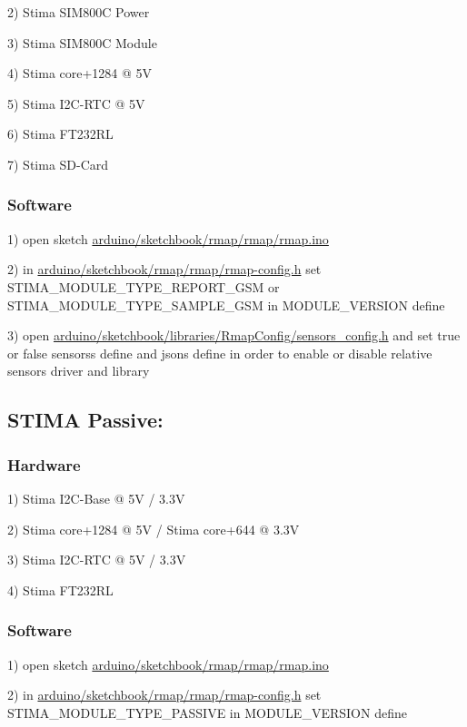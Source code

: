 2) Stima S\+I\+M800C Power

3) Stima S\+I\+M800C Module

4) Stima core+1284 @ 5V

5) Stima I2\+C-\/\+R\+TC @ 5V

6) Stima F\+T232\+RL

7) Stima S\+D-\/\+Card\hypertarget{index_stima_gsm_software}{}\subsubsection{Software}\label{index_stima_gsm_software}
1) open sketch \hyperlink{rmap_8ino}{arduino/sketchbook/rmap/rmap/rmap.\+ino}

2) in \hyperlink{rmap-config_8h}{arduino/sketchbook/rmap/rmap/rmap-\/config.\+h} set S\+T\+I\+M\+A\+\_\+\+M\+O\+D\+U\+L\+E\+\_\+\+T\+Y\+P\+E\+\_\+\+R\+E\+P\+O\+R\+T\+\_\+\+G\+SM or S\+T\+I\+M\+A\+\_\+\+M\+O\+D\+U\+L\+E\+\_\+\+T\+Y\+P\+E\+\_\+\+S\+A\+M\+P\+L\+E\+\_\+\+G\+SM in M\+O\+D\+U\+L\+E\+\_\+\+V\+E\+R\+S\+I\+ON define

3) open \hyperlink{sensors__config_8h}{arduino/sketchbook/libraries/\+Rmap\+Config/sensors\+\_\+config.\+h} and set true or false sensors\textquotesingle{}s define and json\textquotesingle{}s define in order to enable or disable relative sensor\textquotesingle{}s driver and library\hypertarget{index_stima_passive}{}\subsection{S\+T\+I\+M\+A Passive\+:}\label{index_stima_passive}
\hypertarget{index_stima_passive_hardware}{}\subsubsection{Hardware}\label{index_stima_passive_hardware}
1) Stima I2\+C-\/\+Base @ 5V / 3.\+3V

2) Stima core+1284 @ 5V / Stima core+644 @ 3.\+3V

3) Stima I2\+C-\/\+R\+TC @ 5V / 3.\+3V

4) Stima F\+T232\+RL\hypertarget{index_stima_passive_software}{}\subsubsection{Software}\label{index_stima_passive_software}
1) open sketch \hyperlink{rmap_8ino}{arduino/sketchbook/rmap/rmap/rmap.\+ino}

2) in \hyperlink{rmap-config_8h}{arduino/sketchbook/rmap/rmap/rmap-\/config.\+h} set S\+T\+I\+M\+A\+\_\+\+M\+O\+D\+U\+L\+E\+\_\+\+T\+Y\+P\+E\+\_\+\+P\+A\+S\+S\+I\+VE in M\+O\+D\+U\+L\+E\+\_\+\+V\+E\+R\+S\+I\+ON define

